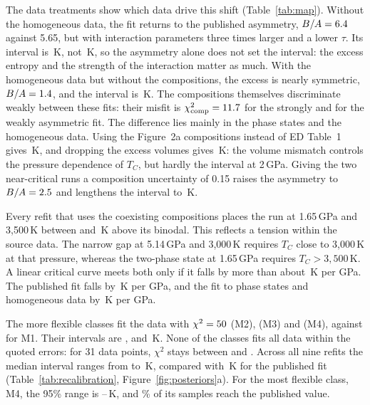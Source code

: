 The data treatments show which data drive this shift (Table~\ref{tab:map}). Without the
homogeneous data, the fit returns to the published asymmetry, $B/A = 6.4{}$
against 5.65, but with interaction parameters three times larger and a lower $\tau$. Its
interval is \IntMOnePhaseComp{}\,K, not \pubIntTwo{}\,K, so the asymmetry alone does not set the
interval: the excess entropy and the strength of the interaction matter as much. With the
homogeneous data but without the compositions, the excess is nearly symmetric,
$B/A = 1.4{}$, and the interval is \IntMOnePhaseHom{}\,K. The compositions themselves
discriminate weakly between these fits: their misfit is $\chi^2_{\rm comp} =
11.7{}$ for the strongly and \ChiCompMOneTable{} for the weakly asymmetric
fit. The difference lies mainly in the phase states and the
homogeneous data. Using the Figure~2a compositions instead of ED Table~1 gives
\IntMOneFigure{}\,K, and dropping the excess volumes gives \IntMOneNoVolume{}\,K: the volume
mismatch controls the pressure dependence of $T_C$, but hardly the interval at 2\,GPa. Giving
the two near-critical runs a composition uncertainty of 0.15 raises the asymmetry to
$B/A = 2.5{}$ and lengthens the interval to \IntMOneInflated{}\,K.

Every refit that uses the coexisting compositions places the run at 1.65\,GPa and 3,500\,K
between \missLo{} and \missHi{}\,K above its binodal. This reflects a tension within the source
data. The narrow gap at 5.14\,GPa and 3,000\,K requires $T_C$ close to 3,000\,K at that pressure,
whereas the two-phase state at 1.65\,GPa requires $T_C > 3{,}500$\,K. A linear critical curve
meets both only if it falls by more than about \slopeMinimum{}\,K per GPa. The published fit falls
by \slopePublished{}\,K per GPa, and the fit to phase states and homogeneous data by
\SlopeMOnePhaseHom{}\,K per GPa.

The more flexible classes fit the data with $\chi^2 = 50{}$ (M2), \ChiMThree{} (M3) and
\ChiMFour{} (M4), against \ChiMOneTable{} for M1. Their intervals are \IntMTwo{},
\IntMThree{} and \IntMFour{}\,K. None of the classes fits all data within the quoted errors: for 31 data
points, $\chi^2$ stays between \ChiMTwo{} and \ChiMOneTable{}. Across all nine refits the median
interval ranges from \IntRangeLo{} to \IntRangeHi{}\,K, compared with \pubIntTwo{}\,K for the
published fit (Table~\ref{tab:recalibration}, Figure~\ref{fig:posteriors}a). For the most
flexible class, M4, the 95\% range is \IntMFourLoNinetyFive{}--\IntMFourHiNinetyFive{}\,K, and
\IntMFourPubTail{}\% of its samples reach the published value.

